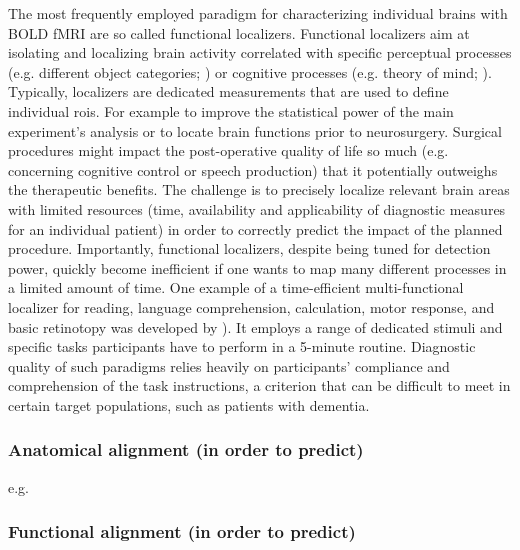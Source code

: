 
%
The most frequently employed paradigm for characterizing individual brains with
BOLD fMRI are so called functional localizers.
%
Functional localizers aim at isolating and localizing brain activity correlated
with specific perceptual processes (e.g. different object categories;
\citet{kanwisher1997ffa}) or cognitive processes (e.g. theory of mind;
\citet{spunt2014validating}).
%
Typically, localizers are dedicated measurements that are used to define
individual \acp{roi}.
%
For example to improve the statistical power of the main experiment's analysis
or to locate brain functions prior to neurosurgery.
Surgical procedures might impact the post-operative quality of life so much
(e.g. concerning cognitive control or speech production) that it potentially
outweighs the therapeutic benefits.
%
The challenge is to precisely localize relevant brain areas with limited
resources (time, availability and applicability of diagnostic measures for an
individual patient) in order to correctly predict the impact of the planned
procedure.
%
Importantly, functional localizers, despite being tuned for detection power,
quickly become inefficient if one wants to map many different processes in a
limited amount of time.
%
One example of a time-efficient multi-functional localizer for reading, language
comprehension, calculation, motor response, and basic retinotopy was developed
by \citep{pinel2007fast}).
%
It employs a range of dedicated stimuli and specific tasks participants have to
perform in a 5-minute routine.
%
Diagnostic quality of such paradigms relies heavily on participants' compliance
and comprehension of the task instructions, a criterion that can be difficult to
meet in certain target populations, such as patients with dementia.


\subsubsection{Anatomical alignment (in order to predict)}

e.g. \citep{weiner2018defining}


\subsubsection{Functional alignment (in order to predict)}

